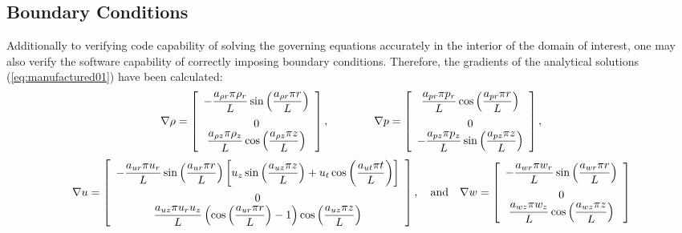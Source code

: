 \documentclass[10pt]{article}
\begin{document}
\subsection{Boundary Conditions}
Additionally to verifying code capability of solving the governing equations accurately in the interior of the domain of interest, one may also verify the software capability of correctly imposing boundary conditions. Therefore, the gradients of the  analytical solutions (\ref{eq:manufactured01}) have been calculated:
\begin{equation*}
\nabla  \rho= \left[ \begin{array}{c}
-\dfrac{  a_{\rho r}  \pi \rho_r}{L} \sin\left( \dfrac{ a_{\rho r}  \pi  r}{L}\right)\vspace{5pt} \\
 0\\
 \dfrac{  a_{\rho z}  \pi \rho_z}{L}  \cos\left( \dfrac{ a_{\rho z}  \pi  z}{L}\right)
\end{array} \right],
\qquad\quad\quad
\nabla p = \left[ \begin{array}{c}
  \dfrac{  a_{pr}  \pi p_r}{L} \cos\left( \dfrac{ a_{pr}  \pi  r}{L}\right)\vspace{5pt}\\
  0\\
- \dfrac{  a_{pz}  \pi p_z}{L} \sin\left( \dfrac{ a_{pz}  \pi  z}{L}\right)
\end{array} \right],
\end{equation*}
\begin{equation*}
\nabla u = \left[ \begin{array}{c}
  -\dfrac{  a_{ur}  \pi u_r }{L} \sin\left( \dfrac{ a_{ur}  \pi  r}{L}\right)\left[u_z\sin\left( \dfrac{ a_{uz}  \pi  z}{L}\right)+u_t\cos\left( \dfrac{ a_{ut}  \pi  t}{L}\right)\right]\vspace{5pt}\\
  0\\
   \dfrac{  a_{uz}  \pi u_r u_z}{L} \left( \cos\left( \dfrac{ a_{ur}  \pi  r}{L}\right) -1\right)\cos\left( \dfrac{ a_{uz}  \pi  z}{L}\right)
\end{array} \right],
\quad\mbox{and}\quad
\nabla w = \left[ \begin{array}{c}
-\dfrac{  a_{wr}  \pi  w_r}{L} \sin\left( \dfrac{ a_{wr}  \pi  r}{L}\right)\vspace{5pt}\\
 0\\
  \dfrac{  a_{wz}  \pi w_z}{L}  \cos\left( \dfrac{ a_{wz}  \pi  z}{L}\right)
\end{array} \right]
\end{equation*}
\end{document}
